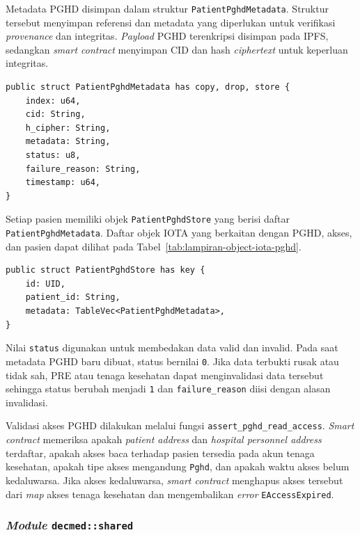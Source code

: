 Metadata PGHD disimpan dalam struktur \texttt{PatientPghdMetadata}. 
Struktur tersebut menyimpan referensi dan metadata yang diperlukan untuk verifikasi \textit{provenance} dan integritas. 
\textit{Payload} PGHD terenkripsi disimpan pada IPFS, sedangkan \textit{smart contract} menyimpan CID dan hash \textit{ciphertext} untuk keperluan integritas.

\begin{lstlisting}[caption={Struktur Metadata PGHD pada \textit{smart contract}}, label={lst:patient-pghd-metadata-struct}, float=htb]
public struct PatientPghdMetadata has copy, drop, store {
    index: u64,
    cid: String,
    h_cipher: String,
    metadata: String,
    status: u8,
    failure_reason: String,
    timestamp: u64,
}
\end{lstlisting}

Setiap pasien memiliki objek \texttt{PatientPghdStore} yang berisi daftar \texttt{PatientPghdMetadata}.
Daftar objek IOTA yang berkaitan dengan PGHD, akses, dan pasien dapat dilihat pada Tabel~\ref{tab:lampiran-object-iota-pghd}.

\begin{lstlisting}[caption={Struktur penyimpanan metadata PGHD per pasien pada \textit{smart contract}}, label={lst:patient-pghd-store-struct}, float=htb]
public struct PatientPghdStore has key {
    id: UID,
    patient_id: String,
    metadata: TableVec<PatientPghdMetadata>,
}
\end{lstlisting}

Nilai \texttt{status} digunakan untuk membedakan data valid dan invalid. 
Pada saat metadata PGHD baru dibuat, status bernilai \texttt{0}. 
Jika data terbukti rusak atau tidak sah, PRE atau tenaga kesehatan dapat menginvalidasi data tersebut sehingga status berubah menjadi \texttt{1} dan \texttt{failure\_reason} diisi dengan alasan invalidasi.

Validasi akses PGHD dilakukan melalui fungsi \texttt{assert\_pghd\_read\_access}. 
\textit{Smart contract} memeriksa apakah \textit{patient address} dan \textit{hospital personnel address} terdaftar, apakah akses baca terhadap pasien tersedia pada akun tenaga kesehatan, apakah tipe akses mengandung \texttt{Pghd}, dan apakah waktu akses belum kedaluwarsa. 
Jika akses kedaluwarsa, \textit{smart contract} menghapus akses tersebut dari \textit{map} akses tenaga kesehatan dan mengembalikan \textit{error} \texttt{EAccessExpired}.

\subsubsection{\textit{Module} \texttt{decmed::shared}}\label{subsubsec:sc-module-shared}

